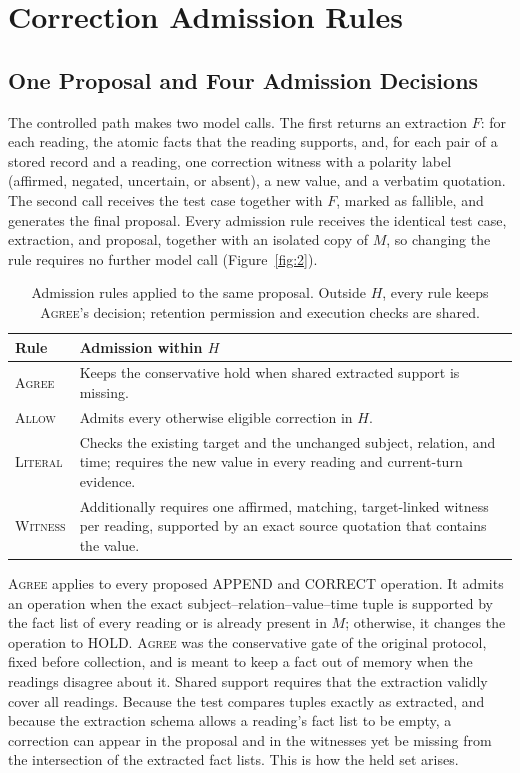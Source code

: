 \documentclass[acmsmall,review]{acmart}
\newcommand{\agree}{\textsc{Agree}}
\newcommand{\allow}{\textsc{Allow}}
\newcommand{\literal}{\textsc{Literal}}
\newcommand{\witness}{\textsc{Witness}}
\begin{document}
\section{Correction Admission Rules}\label{sec:rules}
\subsection{One Proposal and Four Admission Decisions}\label{sec:admission}
The controlled path makes two model calls. The first returns an extraction $F$: for each reading, the atomic facts that the reading supports, and, for each pair of a stored record and a reading, one correction witness with a polarity label (affirmed, negated, uncertain, or absent), a new value, and a verbatim quotation. The second call receives the test case together with $F$, marked as fallible, and generates the final proposal. Every admission rule receives the identical test case, extraction, and proposal, together with an isolated copy of $M$, so changing the rule requires no further model call (Figure~\ref{fig:2}).
\raggedbottom
\begin{table}[tbp]
\centering
\caption{Admission rules applied to the same proposal. Outside $H$, every rule keeps \agree{}'s decision; retention permission and execution checks are shared.}\label{tab:3}
\small
\setlength{\tabcolsep}{3pt}
\begin{tabular}{@{}>{\raggedright\arraybackslash}p{}>{\raggedright\arraybackslash}p{}@{}}
\toprule
\textbf{Rule} & \textbf{Admission within $H$} \\
\midrule
\agree{} & Keeps the conservative hold when shared extracted support is missing. \\
\allow{} & Admits every otherwise eligible correction in $H$. \\
\literal{} & Checks the existing target and the unchanged subject, relation, and time; requires the new value in every reading and current-turn evidence. \\
\witness{} & Additionally requires one affirmed, matching, target-linked witness per reading, supported by an exact source quotation that contains the value. \\
\bottomrule
\end{tabular}
\end{table}

\agree{} applies to every proposed APPEND and CORRECT operation. It admits an operation when the exact subject--relation--value--time tuple is supported by the fact list of every reading or is already present in $M$; otherwise, it changes the operation to HOLD. \agree{} was the conservative gate of the original protocol, fixed before collection, and is meant to keep a fact out of memory when the readings disagree about it. Shared support requires that the extraction validly cover all readings. Because the test compares tuples exactly as extracted, and because the extraction schema allows a reading's fact list to be empty, a correction can appear in the proposal and in the witnesses yet be missing from the intersection of the extracted fact lists. This is how the held set arises.
\end{document}
